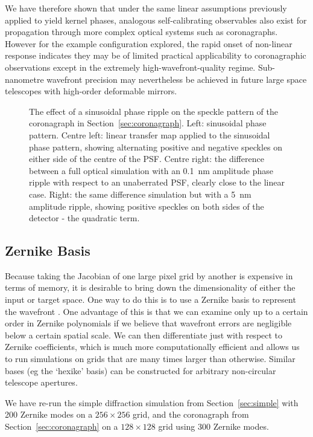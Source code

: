 \documentclass[modern]{aastex63}
\begin{document}
We have therefore shown that under the same linear assumptions previously applied to yield kernel phases, analogous self-calibrating observables also exist for propagation through more complex optical systems such as coronagraphs. However for the example configuration explored, the rapid onset of non-linear response indicates they may be of limited practical applicability to coronagraphic observations except in the extremely high-wavefront-quality regime. Sub-nanometre wavefront precision may nevertheless be achieved in future large space telescopes with high-order deformable mirrors.

\begin{figure}
\caption{The effect of a sinusoidal phase ripple on the speckle pattern of the coronagraph in Section~\ref{sec:coronagraph}. Left: sinusoidal phase pattern. Centre left: linear transfer map applied to the sinusoidal phase pattern, showing alternating positive and negative speckles on either side of the centre of the PSF. Centre right: the difference between a full optical simulation with an 0.1~nm amplitude phase ripple with respect to an unaberrated PSF, clearly close to the linear case. Right: the same difference simulation but with a 5~nm amplitude ripple, showing positive speckles on both sides of the detector - the quadratic term. \label{corona_nonlinearity}}
\end{figure}

\subsection{Zernike Basis}
\label{zernike}

Because taking the Jacobian of one large pixel grid by another is expensive in terms of memory, it is desirable to bring down the dimensionality of either the input or target space. One way to do this is to use a Zernike basis to represent the wavefront \citep{zernike34}. One advantage of this is that we can examine only up to a certain order in Zernike polynomials if we believe that wavefront errors are negligible below a certain spatial scale. We can then differentiate just with respect to Zernike coefficients, which is much more computationally efficient and allows us to run simulations on grids that are many times larger than otherwise. Similar bases (eg the `hexike' basis) can be constructed for arbitrary non-circular telescope apertures.

We have re-run the simple diffraction simulation from Section~\ref{sec:simple} with 200 Zernike modes on a $256\times256$ grid, and the coronagraph from Section~\ref{sec:coronagraph} on a $128\times128$ grid using 300 Zernike modes. 
\end{document}
